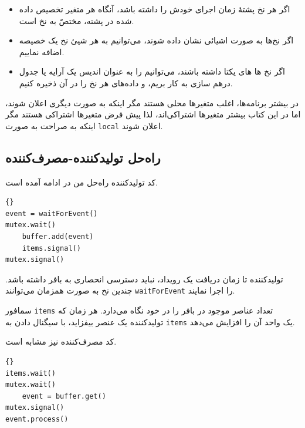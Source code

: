 \documentclass{book}
\newcommand{\clearemptydoublepage}{\newpage\cleardoublepage}
\begin{document}
\begin{itemize}

\item 
    اگر هر نخ پشتهٔ زمان اجرای خودش را داشته باشد، آنگاه هر متغیر تخصیص داده شده در پشته، 
    مختصّ به نخ است.

\item 
    اگر نخ‌ها به صورت اشیائی نشان داده شوند، می‌توانیم به هر شیئ نخ یک خصیصه اضافه نماییم.

\item 
    اگر نخ ها های یکتا داشته باشند، می‌توانیم  را به عنوان اندیس یک آرایه یا جدول درهم سازی به کار بریم، 
    و داده‌های هر نخ را در آن ذخیره کنیم.

\end{itemize}

    در بیشتر برنامه‌ها، اغلب متغیرها محلی هستند مگر اینکه به صورت دیگری اعلان شوند، 
    اما در این کتاب بیشتر متغیرها اشتراکی‌اند، لذا پیش فرض متغیرها اشتراکی هستند مگر اینکه به صراحت به صورت 
    {\tt local} اعلان شوند.


\clearemptydoublepage
\subsection{راه‌حل تولیدکننده-مصرف‌کننده}

    کد تولیدکننده راه‌حل من در ادامه آمده است. 

\begin{latin}
\begin{lstlisting}[title=\rl{راه‌حل تولیدکننده}]{}
event = waitForEvent()
mutex.wait()
    buffer.add(event)
    items.signal()
mutex.signal()
\end{lstlisting}
\end{latin}

    تولیدکننده تا زمان دریافت یک رویداد، نباید دسترسی انحصاری به بافر داشته باشد. 
    چندین نخ به صورت همزمان می‌توانند  {\tt waitForEvent} را اجرا نمایند. 
    
    سمافور {\tt items} تعداد عناصر موجود در بافر را در خود نگاه می‌دارد. هر زمان که تولیدکننده یک عنصر بیفزاید، با سیگنال دادن  
    به {\tt items} یک واحد آن را افزایش می‌دهد. 

    کد مصرف‌کننده نیز مشابه است. 

\begin{latin}
\begin{lstlisting}[title=\rl{راه‌حل مصرف‌کننده}]{}
items.wait()
mutex.wait()
    event = buffer.get()
mutex.signal()
event.process()
\end{lstlisting}
\end{latin}
\end{document}
